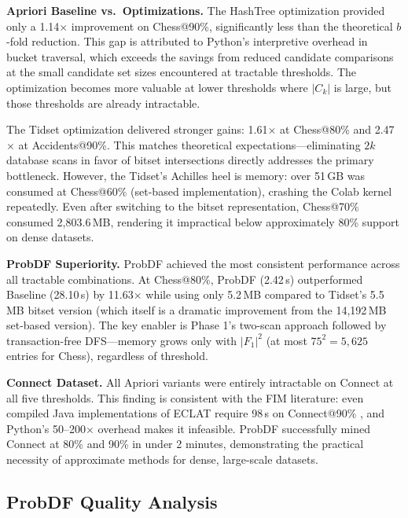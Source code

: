 \documentclass[conference]{IEEEtran}
\begin{document}
\textbf{Apriori Baseline vs.\ Optimizations.}
The HashTree optimization provided only a 1.14$\times$ improvement on
Chess@90\%, significantly less than the theoretical $b$-fold reduction.
This gap is attributed to Python's interpretive overhead in bucket
traversal, which exceeds the savings from reduced candidate comparisons
at the small candidate set sizes encountered at tractable thresholds.
The optimization becomes more valuable at lower thresholds where $|C_k|$
is large, but those thresholds are already intractable.

The Tidset optimization delivered stronger gains: 1.61$\times$ at
Chess@80\% and 2.47$\times$ at Accidents@90\%. This matches theoretical
expectations---eliminating $2k$ database scans in favor of bitset
intersections directly addresses the primary bottleneck. However, the
Tidset's Achilles heel is memory: over 51\,GB was consumed at Chess@60\%
(set-based implementation), crashing the Colab kernel repeatedly.
Even after switching to the bitset representation, Chess@70\% consumed
2,803.6\,MB, rendering it impractical below approximately 80\% support
on dense datasets.

\textbf{ProbDF Superiority.}
ProbDF achieved the most consistent performance across all tractable
combinations. At Chess@80\%, ProbDF (2.42\,s) outperformed Baseline
(28.10\,s) by 11.63$\times$ while using only 5.2\,MB compared to Tidset's
5.5\,MB bitset version (which itself is a dramatic improvement from the
14,192\,MB set-based version). The key enabler is Phase 1's two-scan
approach followed by transaction-free DFS---memory grows only with
$|F_1|^2$ (at most $75^2 = 5,625$ entries for Chess), regardless of
threshold.

\textbf{Connect Dataset.}
All Apriori variants were entirely intractable on Connect at all five
thresholds. This finding is consistent with the FIM literature:
even compiled Java implementations of ECLAT require 98\,s on
Connect@90\% \cite{shfim2022}, and Python's 50--200$\times$ overhead
makes it infeasible. ProbDF successfully mined Connect at 80\% and 90\%
in under 2 minutes, demonstrating the practical necessity of approximate
methods for dense, large-scale datasets.

\subsection{ProbDF Quality Analysis}
\end{document}
